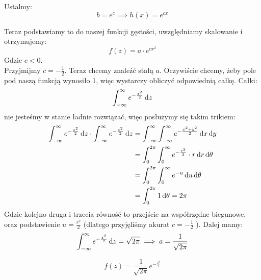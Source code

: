 Ustalmy:
\[
	b = e^c \implies h(x) = e^{cx}
\]

Teraz podstawiamy to do naszej funkcji gęstości, uwzględniamy skalowanie i otrzymujemy:
\[
	f(z) = a \cdot e^{cx^2}
\]
Gdzie \( c < 0 \). \\


Przyjmijmy \( c = -\frac{1}{2} \). Teraz chcemy znaleźć stałą \( a \). Oczywiście chcemy, żeby pole pod naszą funkcją wynosiło 1, więc wystarczy obliczyć odpowiednią całkę.
Całki:
\[
	\int_{-\infty}^{\infty} e^{-\frac{z^2}{2}} \mathop{}\!\mathrm{d} z
\]
nie jesteśmy w stanie ładnie rozwiązać, więc posłużymy się takim trikiem:
\begin{align*}
	\int_{-\infty}^{\infty} e^{-\frac{z^2}{2}} \diff z \cdot \int_{-\infty}^{\infty} e^{-\frac{z^2}{2}} \diff z & = \int_{-\infty}^{\infty} \int_{-\infty}^{\infty} e^{-\frac{x^2 + y^2}{2}} \diff x \diff y \\
	                                                                                                            & = \int_0^{2\pi} \int_0^{\infty} e^{-\frac{r^2}{2}} \cdot r \diff r \diff \theta            \\
	                                                                                                            & = \int_0^{2\pi} \int_0^{\infty} e^{-u} \diff u \diff \theta                                \\
	                                                                                                            & = \int_0^{2\pi} 1 \diff \theta = 2\pi
\end{align*}
Gdzie kolejno druga i trzecia równość to przejście na współrzędne biegunowe, oraz podstawienie \( u = \frac{r^2}{2} \) (dlatego przyjęliśmy akurat \( c = -\frac{1}{2} \) ).
Dalej mamy:
\[
	\int_{-\infty}^{\infty} e^{-\frac{z^2}{2}} \mathop{}\!\mathrm{d} z = \sqrt{2\pi} \implies a = \frac{1}{\sqrt{2\pi}}
\]

\begin{minipage}[c]{0.5\linewidth}
	\[
		f(z) = \frac{1}{\sqrt{2\pi}} e^{-\frac{z^2}{2}}
	\]
\end{minipage}
\quad
\begin{minipage}[c]{0.4\linewidth}
	\centering
\end{minipage}

